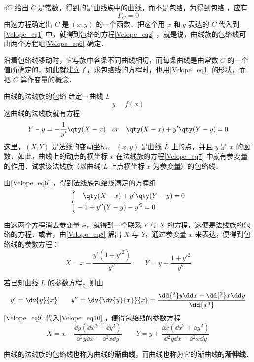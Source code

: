 $\dd C$ 给出 $C$ 是常数，得到的是曲线族中的曲线，而不是包络，为得到包络
，应有
\begin{equation}
F_C=0
\end{equation}
由这方程确定出 $C$ 是 $(x,y)$ 的一个函数．把这个用 $x$ 和 $y$ 表达的 $C$ 代入到\autoref{Velope_eq1} 中，就得到包络的方程\autoref{Velope_eq2} ，就是说，曲线族的包络线可由两个方程组\autoref{Velope_eq6} 确定．

沿着包络线移动时，它与族中各条不同曲线相切，而每条曲线是由常数 $C$ 的一个值所确定的，如此就建立了，求包络线的方程时，也用\autoref{Velope_eq1} 的形状，而把 $C$ 算作变量的概念．
\begin{example}{曲线的法线族的包络}
给定一曲线 $L$
\begin{equation}
y=f(x)
\end{equation}
这曲线的法线族就有方程
\begin{equation}\label{Velope_eq7}
Y-y=-\frac{1}{y'}\qty(X-x)\quad or\quad\qty(X-x)+y'\qty(Y-y)=0
\end{equation}
这里，$(X,Y)$ 是法线的变动坐标， $(x,y)$ 是曲线 $L$ 上的点，并且 $y$ 是 $x$ 的函数．如此，曲线上的动点的横坐标 $x$ 在法线族的方程\autoref{Velope_eq7} 中就有参变量的作用．试求该法线族（以曲线 $L$ 上点横坐标 $x$ 为参变量）的包络线．

由\autoref{Velope_eq6} ，得到法线族包络线满足的方程组
\begin{equation}\label{Velope_eq8}
\left\{\begin{aligned}
&\quad\qty(X-x)+y'\qty(Y-y)=0\\
&-1+y''(Y-y)-y'^2=0
\end{aligned}\right.
\end{equation}
 

由这两个方程消去参变量 $x$，就得到一个联系 $Y$ 与 $X$ 的方程，这便是法线族的包络的方程．或者，由\autoref{Velope_eq8} 解出 $X$ 与 $Y$，通过参变量 $x$ 来表达，便得到包络线的参数方程：
\begin{equation}\label{Velope_eq10}
X=x-\frac{y'(1+y'^2)}{y''}\qquad Y=y+\frac{1+y'^2}{y''}
\end{equation}

若已知曲线 $L$ 的参数方程，则由
\begin{equation}\label{Velope_eq9}
y'=\dv{y}{x}\qquad y''=\dv{\dv{y}{x}}{x}=\frac{\dd{^2}y\dd x-\dd{^2}x\dd y}{\dd{x^3}}
\end{equation}
\autoref{Velope_eq9} 代入\autoref{Velope_eq10} ，便得包络线的参数方程
\begin{equation}
X=x-\frac{\dd y(\dd x^2+\dd y^2)}{\dd{^2y\dd x}-\dd{^2x}\dd y}
\qquad Y=y+\frac{\dd x(\dd x^2+\dd y^2)}{\dd{^2y}\dd x-\dd{^2x}\dd y}
\end{equation}

曲线的法线族的包络线也称为曲线的\textbf{渐曲线}，而曲线也称为它的渐曲线的\textbf{渐伸线}．
\end{example}